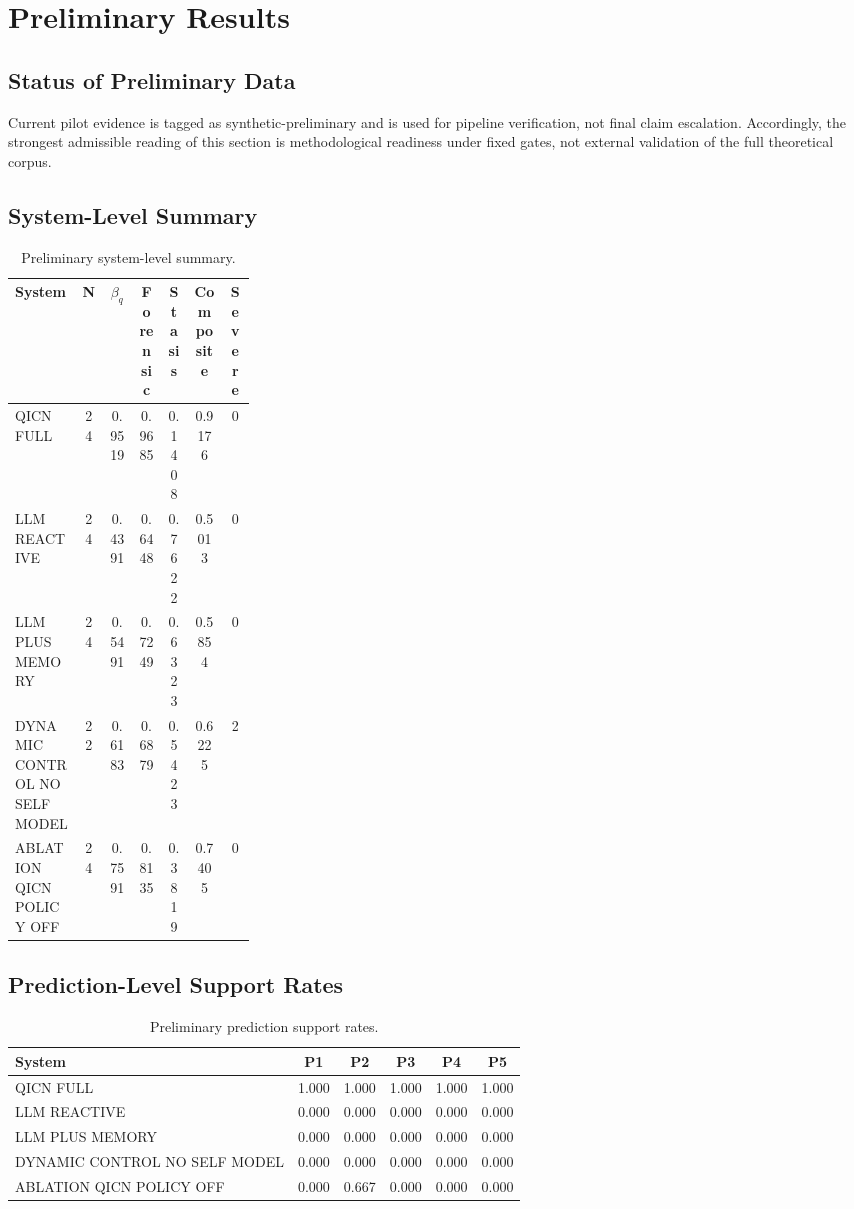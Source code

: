 \documentclass[11pt,a4paper]{article}
\theoremstyle{definition}
\begin{document}
\section{Preliminary Results}
\subsection{Status of Preliminary Data}
Current pilot evidence is tagged as synthetic-preliminary and is used for pipeline verification, not final claim escalation.
Accordingly, the strongest admissible reading of this section is methodological readiness under fixed gates, not external validation of the full theoretical corpus.

\subsection{System-Level Summary}
\begin{table}[!htbp]
\centering
\setlength{\tabcolsep}{3pt}
\begin{tabular}{>{\raggedright\arraybackslash}p{0.28\linewidth}cccccc}
\toprule
System & N & $\beta_q$ & Forensic & Stasis & Composite & Severe \\
\midrule
QICN FULL & 24 & 0.9519 & 0.9685 & 0.1408 & 0.9176 & 0 \\
LLM REACTIVE & 24 & 0.4391 & 0.6448 & 0.7622 & 0.5013 & 0 \\
LLM PLUS MEMORY & 24 & 0.5491 & 0.7249 & 0.6323 & 0.5854 & 0 \\
DYNAMIC CONTROL NO SELF MODEL & 22 & 0.6183 & 0.6879 & 0.5423 & 0.6225 & 2 \\
ABLATION QICN POLICY OFF & 24 & 0.7591 & 0.8135 & 0.3819 & 0.7405 & 0 \\
\bottomrule
\end{tabular}
\caption{Preliminary system-level summary.}
\end{table}

\subsection{Prediction-Level Support Rates}
\begin{table}[!htbp]
\centering
\begin{tabular}{lccccc}
\toprule
System & P1 & P2 & P3 & P4 & P5 \\
\midrule
QICN FULL & 1.000 & 1.000 & 1.000 & 1.000 & 1.000 \\
LLM REACTIVE & 0.000 & 0.000 & 0.000 & 0.000 & 0.000 \\
LLM PLUS MEMORY & 0.000 & 0.000 & 0.000 & 0.000 & 0.000 \\
DYNAMIC CONTROL NO SELF MODEL & 0.000 & 0.000 & 0.000 & 0.000 & 0.000 \\
ABLATION QICN POLICY OFF & 0.000 & 0.667 & 0.000 & 0.000 & 0.000 \\
\bottomrule
\end{tabular}
\caption{Preliminary prediction support rates.}
\end{table}
\end{document}
